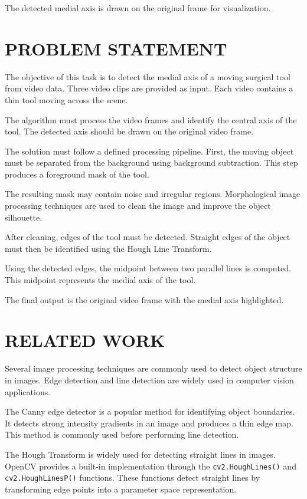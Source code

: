 \documentclass[letterpaper,10pt,conference]{ieeeconf}
\begin{document}
The detected medial axis is drawn on the original frame for visualization.


\section{PROBLEM STATEMENT}

The objective of this task is to detect the medial axis of a moving surgical tool from video data. 
Three video clips are provided as input. 
Each video contains a thin tool moving across the scene.

The algorithm must process the video frames and identify the central axis of the tool. 
The detected axis should be drawn on the original video frame.

The solution must follow a defined processing pipeline. 
First, the moving object must be separated from the background using background subtraction. 
This step produces a foreground mask of the tool.

The resulting mask may contain noise and irregular regions. 
Morphological image processing techniques are used to clean the image and improve the object silhouette.

After cleaning, edges of the tool must be detected. 
Straight edges of the object must then be identified using the Hough Line Transform.

Using the detected edges, the midpoint between two parallel lines is computed. 
This midpoint represents the medial axis of the tool.

The final output is the original video frame with the medial axis highlighted.

\section{RELATED WORK}

Several image processing techniques are commonly used to detect object structure in images. 
Edge detection and line detection are widely used in computer vision applications.

The Canny edge detector is a popular method for identifying object boundaries. 
It detects strong intensity gradients in an image and produces a thin edge map. 
This method is commonly used before performing line detection.

The Hough Transform is widely used for detecting straight lines in images. 
OpenCV provides a built-in implementation through the \texttt{cv2.HoughLines()} and \texttt{cv2.HoughLinesP()} functions. 
These functions detect straight lines by transforming edge points into a parameter space representation.
\end{document}
